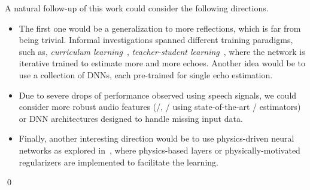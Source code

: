 \mynewline
A natural follow-up of this work could consider the following directions.
\begin{itemize}
    \item The first one would be a generalization to more reflections, which is far from being trivial.
    Informal investigations spanned different training paradigms, such as, \textit{curriculum learning}~, \textit{teacher-student learning}~, where the network is iterative trained to estimate more and more echoes.
    Another idea would be to use a collection of \acp{DNN}, each pre-trained for single echo estimation.
    \item Due to severe drops of performance observed using speech signals, we could consider more robust audio features (\eg/, \ReTF/ using state-of-the-art \ReTF/ estimators) or
    \ac{DNN} architectures designed to handle missing input data.
    \item Finally, another interesting direction would be to use physics-driven neural networks as explored in~,
    where physics-based layers or physically-motivated regularizers are implemented to facilitate the learning.
\end{itemize}
\qed

